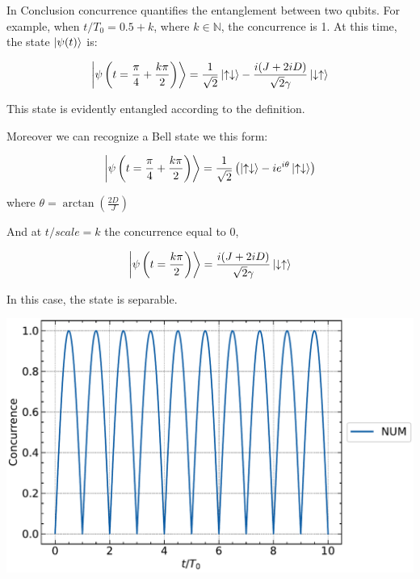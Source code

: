 In Conclusion
 concurrence 
 quantifies the entanglement between two qubits. 
 For example, when \(t/T_0 = 0.5 + k\), where \(k \in \mathbb{N}\), the concurrence is 1. At this time, the state \(\ket{\psi (t)}\) is:


 
 \begin{equation*}
 	\ket{\psi \left( t = \frac{\pi}{4} + \frac{k\pi}{2}\right) } = \frac{1}{\sqrt{2}} \ket{\uparrow \downarrow} - \frac{i(J + 2iD)}{\sqrt{2}\gamma}   \ket{\downarrow \uparrow}
 \end{equation*}
 
 
This state is evidently entangled according to the definition.

Moreover we can recognize a Bell state we this form: 

\begin{equation}
		\ket{\psi \left( t = \frac{\pi}{4} + \frac{k\pi}{2}\right) } = \frac{1}{\sqrt{2}} \left(  \ket{\uparrow \downarrow} -ie^{i\theta}\ket{\uparrow \downarrow}  \right)
\end{equation}

where $ \theta = \arctan\left( \frac{2D}{J}\right)$


 
And at $t/scale = k$ the concurrence equal to $0$, 

 \begin{equation*}
	\ket{\psi \left( t = \frac{k\pi}{2}\right) } = \frac{i(J + 2iD)}{\sqrt{2}\gamma}   \ket{\downarrow \uparrow}
\end{equation*}

In this case, the state is separable.
	

\includegraphics*{results_and_discussion/2_qubits/up_down_without_ana.pdf}

